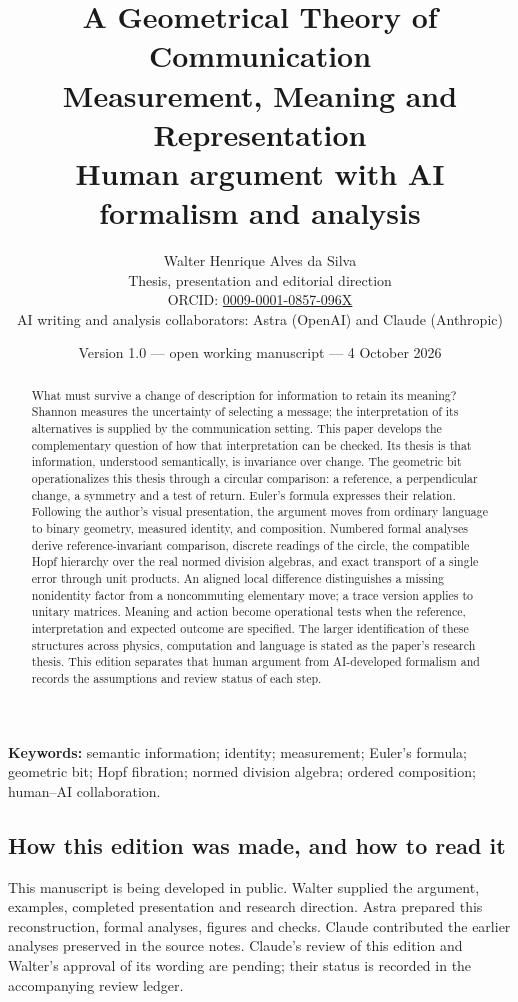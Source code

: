 \documentclass[11pt,a4paper]{article}
\title{A Geometrical Theory of Communication\\[5pt]
\large Measurement, Meaning and Representation\\[5pt]
\normalsize Human argument with AI formalism and analysis}
\author{Walter Henrique Alves da Silva\\
\small Thesis, presentation and editorial direction\\
\small ORCID: \href{https://orcid.org/0009-0001-0857-096X}{0009-0001-0857-096X}\\[6pt]
\small AI writing and analysis collaborators: Astra (OpenAI) and Claude (Anthropic)}
\date{Version 1.0 --- open working manuscript --- 4 October 2026}
\begin{document}
\maketitle

\begin{abstract}
What must survive a change of description for information to retain its meaning?
Shannon measures the uncertainty of selecting a message; the interpretation of
its alternatives is supplied by the communication setting. This paper develops
the complementary question of how that interpretation can be checked. Its thesis
is that information, understood semantically, is invariance over change. The
geometric bit operationalizes this thesis through a circular comparison: a
reference, a perpendicular change, a symmetry and a test of return. Euler's
formula expresses their relation. Following the author's visual presentation,
the argument moves from ordinary language to binary geometry, measured identity,
and composition. Numbered formal analyses derive reference-invariant comparison,
discrete readings of the circle, the compatible Hopf hierarchy over the real
normed division algebras, and exact transport of a single error through unit
products. An aligned local difference distinguishes a missing nonidentity factor
from a noncommuting elementary move; a trace version applies to unitary matrices.
Meaning and action become operational tests when the reference, interpretation
and expected outcome are specified. The larger identification of these
structures across physics, computation and language is stated as the paper's
research thesis. This edition separates that human argument from AI-developed
formalism and records the assumptions and review status of each step.
\end{abstract}

\noindent\textbf{Keywords:} semantic information; identity; measurement;
Euler's formula; geometric bit; Hopf fibration; normed division algebra;
ordered composition; human--AI collaboration.

\subsection*{How this edition was made, and how to read it}
This manuscript is being developed in public. Walter supplied the argument,
examples, completed presentation and research direction. Astra prepared this
reconstruction, formal analyses, figures and checks. Claude contributed the
earlier analyses preserved in the source notes. Claude's review of this edition
and Walter's approval of its wording are pending; their status is recorded in
the accompanying review ledger.
\end{document}
